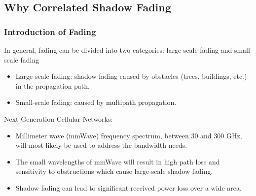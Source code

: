 \documentclass{beamer}
\begin{document}
\subsection{Why Correlated Shadow Fading} %
\begin{frame}
\frametitle{Introduction of Fading}
In general, fading can be divided into two categories: large-scale fading and small-scale fading
\begin{itemize}
\item Large-scale fading: shadow fading caused by obstacles (trees, buildings, etc.) in the propagation path.
\item Small-scale fading: caused by multipath propagation.
\end{itemize}
Next Generation Cellular Networks:
\begin{itemize}
\item Millimeter wave (mmWave) frequency spectrum, between 30 and 300 GHz, will most likely be used to address the bandwidth needs.
\item The small wavelengths of mmWave will result in high path loss and sensitivity to obstructions which cause large-scale shadow fading.
\item Shadow fading can lead to significant received power loss over a wide area.
\end{itemize}
\end{frame}
\end{document}
